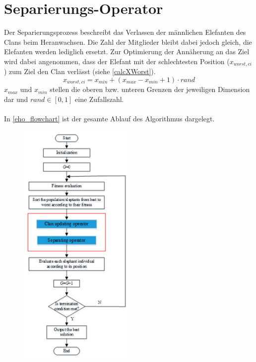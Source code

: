 \section{Separierungs-Operator}
Der Separierungsprozess beschreibt das Verlassen der männlichen Elefanten des Clans beim Heranwachsen. Die Zahl der Mitglieder bleibt dabei jedoch gleich, die Elefanten werden lediglich ersetzt. Zur Optimierung der Annäherung an das Ziel wird dabei angenommen, dass der Elefant mit der schlechtesten Position ($x_{worst, ci}$) zum Ziel den Clan verlässt (siehe \autoref{calcXWorst}).
\begin{equation}
    x_{worst, ci} = x_{min} + (x_{max} - x_{min} + 1) \cdot rand
    \label{calcXWorst}
\end{equation}
$x_{max}$ und $x_{min}$ stellen die oberen bzw. unteren Grenzen der jeweiligen Dimension dar und $rand \in [0,1]$ eine Zufallszahl.\\
\\
In \autoref{eho_flowchart} ist der gesamte Ablauf des Algorithmus dargelegt. 



\begin{figure}[ht]
    \begin{center}
        \includegraphics[width=0.5\textwidth]{assets/img/eho_flowchart.png}
        \caption[EHO Flowchart]{\cite[Li et al, S.4]{li_lei_alavi_wang_2020}}
        \label{eho_flowchart}
    \end{center}
\end{figure}


